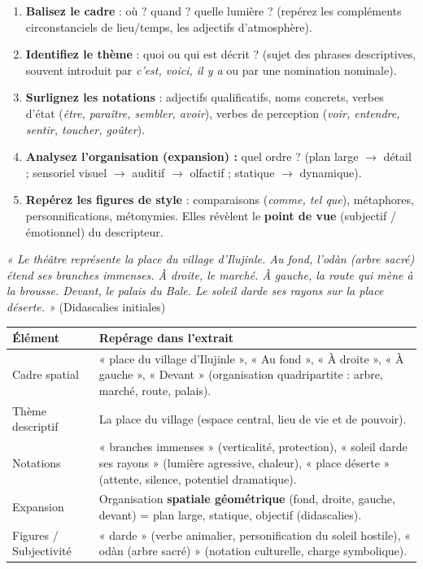 \documentclass[11pt]{article}
\begin{document}
\begin{methode}
\begin{enumerate}
    \item \textbf{Balisez le cadre} : où ? quand ? quelle lumière ? (repérez les compléments circonstanciels de lieu/temps, les adjectifs d'atmosphère).
    \item \textbf{Identifiez le thème} : quoi ou qui est décrit ? (sujet des phrases descriptives, souvent introduit par \emph{c'est, voici, il y a} ou par une nomination nominale).
    \item \textbf{Surlignez les notations} : adjectifs qualificatifs, noms concrets, verbes d'état (\emph{être, paraître, sembler, avoir}), verbes de perception (\emph{voir, entendre, sentir, toucher, goûter}).
    \item \textbf{Analysez l'organisation (expansion) :} quel ordre ? (plan large $\rightarrow$ détail ; sensoriel visuel $\rightarrow$ auditif $\rightarrow$ olfactif ; statique $\rightarrow$ dynamique).
    \item \textbf{Repérez les figures de style} : comparaisons (\emph{comme, tel que}), métaphores, personnifications, métonymies. Elles révèlent le \textbf{point de vue} (subjectif / émotionnel) du descripteur.
\end{enumerate}
\end{methode}

\begin{exemplebox}
\emph{« Le théâtre représente la place du village d'Ilujinle. Au fond, l'odàn (arbre sacré) étend ses branches immenses. À droite, le marché. À gauche, la route qui mène à la brousse. Devant, le palais du Bale. Le soleil darde ses rayons sur la place déserte. »} (Didascalies initiales)

\begin{center}
\begin{tabularx}{\linewidth}{|l|X|}
\hline
\textbf{Élément} & \textbf{Repérage dans l'extrait} \\
\hline
Cadre spatial & « place du village d'Ilujinle », « Au fond », « À droite », « À gauche », « Devant » (organisation quadripartite : arbre, marché, route, palais). \\
\hline
Thème descriptif & La place du village (espace central, lieu de vie et de pouvoir). \\
\hline
Notations & « branches immenses » (verticalité, protection), « soleil darde ses rayons » (lumière agressive, chaleur), « place déserte » (attente, silence, potentiel dramatique). \\
\hline
Expansion & Organisation \textbf{spatiale géométrique} (fond, droite, gauche, devant) = plan large, statique, objectif (didascalies). \\
\hline
Figures / Subjectivité & « darde » (verbe animalier, personification du soleil hostile), « odàn (arbre sacré) » (notation culturelle, charge symbolique). \\
\hline
\end{tabularx}
\end{center}
\end{exemplebox}
\end{document}
